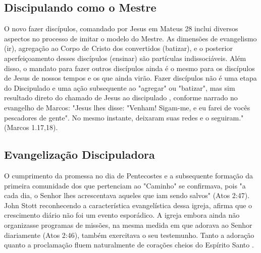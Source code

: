 \documentclass[12pt]{abntex2}
\begin{document}
\subsection{Discipulando como o Mestre}


O novo fazer discípulos, comandado por Jesus em Mateus 28 inclui diversos aspectos no processo de imitar o modelo do Mestre. As dimensões de evangelismo (ir), agregação ao Corpo de Cristo dos convertidos (batizar), e o posterior aperfeiçoamento desses discípulos (ensinar) são partículas indissociáveis. Além disso, o mandato para fazer outros discípulos ainda é o mesmo para os discípulos de Jesus de nossos tempos e os que ainda virão. Fazer discípulos não é uma etapa do Discipulado e uma ação subsequente ao "agregar" ou "batizar", mas sim resultado direto do chamado de Jesus ao discipulado \cite[p. 64]{brandao}, conforme narrado no evangelho de Marcos: "Jesus lhes disse: "Venham! Sigam-me, e eu farei de vocês pescadores de gente". No mesmo instante, deixaram suas redes e o seguiram."(Marcos 1.17,18).

\subsection{Evangelização Discipuladora}

O cumprimento da promessa no dia de Pentecostes e a subsequente formação da primeira comunidade dos que pertenciam ao "Caminho" se confirmava, pois "a cada dia, o Senhor lhes acrescentava aqueles que iam sendo salvos" (Atos 2:47). John Stott reconhecendo a característica evangelística dessa igreja, afirma que o crescimento diário não foi um evento esporádico. A igreja embora ainda não organizasse programas de missões, na mesma medida em que adorava ao Senhor diariamente (Atos 2:46), também exercitava o seu testemunho. Tanto a adoração quanto a proclamação fluem naturalmente de corações cheios do Espírito Santo \cite[p. 118,119]{stott}. 
\end{document}
